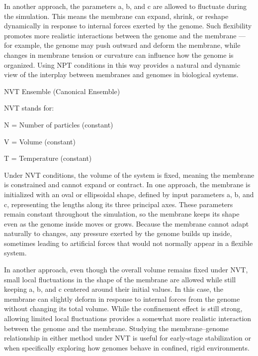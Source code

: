 \documentclass[12pt]{article}
\begin{document}
\begin{flushleft}
In another approach, the parameters a, b, and c are allowed to fluctuate during the simulation. This means the membrane can expand, shrink, or reshape dynamically in response to internal forces exerted by the genome. Such flexibility promotes more realistic interactions between the genome and the membrane — for example, the genome may push outward and deform the membrane, while changes in membrane tension or curvature can influence how the genome is organized. Using NPT conditions in this way provides a natural and dynamic view of the interplay between membranes and genomes in biological systems.

\noindent NVT Ensemble (Canonical Ensemble)

NVT stands for:

    N = Number of particles (constant)

    V = Volume (constant)

    T = Temperature (constant)

Under NVT conditions, the volume of the system is fixed, meaning the membrane is constrained and cannot expand or contract. In one approach, the membrane is initialized with an oval or ellipsoidal shape, defined by input parameters a, b, and c, representing the lengths along its three principal axes. These parameters remain constant throughout the simulation, so the membrane keeps its shape even as the genome inside moves or grows. Because the membrane cannot adapt naturally to changes, any pressure exerted by the genome builds up inside, sometimes leading to artificial forces that would not normally appear in a flexible system.

In another approach, even though the overall volume remains fixed under NVT, small local fluctuations in the shape of the membrane are allowed while still keeping a, b, and c centered around their initial values. In this case, the membrane can slightly deform in response to internal forces from the genome without changing its total volume. While the confinement effect is still strong, allowing limited local fluctuations provides a somewhat more realistic interaction between the genome and the membrane. Studying the membrane–genome relationship in either method under NVT is useful for early-stage stabilization or when specifically exploring how genomes behave in confined, rigid environments.




\end{flushleft}
\end{document}
